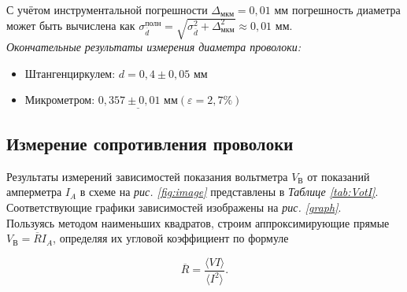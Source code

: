 \documentclass[a4paper,12pt]{article} %
\begin{document}
С учётом инструментальной погрешности $ \Delta_\text{мкм} = 0,01$ мм погрешность диаметра может быть вычислена как $ \sigma^{\text{полн}}_{\overline{d}} = \sqrt{\sigma^2_{\overline{d}} + \Delta^2_{\text{мкм}}} \approx 0,01 \text{ мм}$. \\

\textit{Окончательные результаты измерения диаметра проволоки:}

\begin{itemize}
	\item Штангенциркулем: $ d = 0,4 \pm 0,05 \text{ мм} $
	\item Микрометром:  $ \underline{0,357 \pm 0,01 \text{ мм}} \left(\varepsilon = 2,7 \%\right)  $
\end{itemize}
\subsection{Измерение сопротивления проволоки}

Результаты измерений зависимостей показания вольтметра $ V_\text{В} $ от показаний амперметра $ I_A $ в схеме на \textit{рис.  \ref{fig:image}} представлены в \textit{Таблице \ref{tab:VotI}}. Соответствующие графики зависимостей изображены на \textit{рис. \ref{graph}}.\\

Пользуясь методом наименьших квадратов, строим аппроксимирующие прямые $ V_\text{В} = \overline{R}I_A $, определяя их угловой коэффициент по формуле

\begin{equation}
\overline{R} = \frac{\langle VI \rangle}{\langle I^2 \rangle}.
\end{equation}
\end{document}
